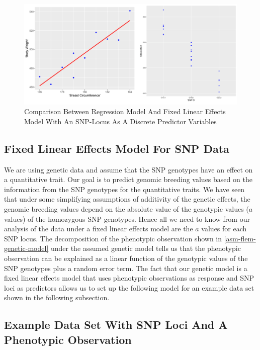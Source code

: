 \documentclass[]{book}
\theoremstyle{definition}
\theoremstyle{definition}
\theoremstyle{definition}
\theoremstyle{remark}
\begin{document}
\begin{figure}
\centering
\includegraphics{odg/compareregflem.png}
\caption{\label{fig:compareregflem}Comparison Between Regression Model And Fixed Linear Effects Model With An SNP-Locus As A Discrete Predictor Variables}
\end{figure}

\hypertarget{asm-flem-flem-for-snp}{%
\subsection{Fixed Linear Effects Model For SNP Data}\label{asm-flem-flem-for-snp}}

We are using genetic data and assume that the SNP genotypes have an effect on a quantitative trait. Our goal is to predict genomic breeding values based on the information from the SNP genotypes for the quantitative traits. We have seen that under some simplifying assumptions of additivity of the genetic effects, the genomic breeding values depend on the absolute value of the genotypic values (\(a\) values) of the homozygous SNP genotypes. Hence all we need to know from our analysis of the data under a fixed linear effects model are the \(a\) values for each SNP locus. The decomposition of the phenotypic observation shown in \ref{asm-flem-genetic-model} under the assumed genetic model tells us that the phenotypic observation can be explained as a linear function of the genotypic values of the SNP genotypes plus a random error term. The fact that our genetic model is a fixed linear effects model that uses phenotypic observations as response and SNP loci as predictors allows us to set up the following model for an example data set shown in the following subsection.

\hypertarget{asm-flem-snp-obs}{%
\subsection{Example Data Set With SNP Loci And A Phenotypic Observation}\label{asm-flem-snp-obs}}
\end{document}
